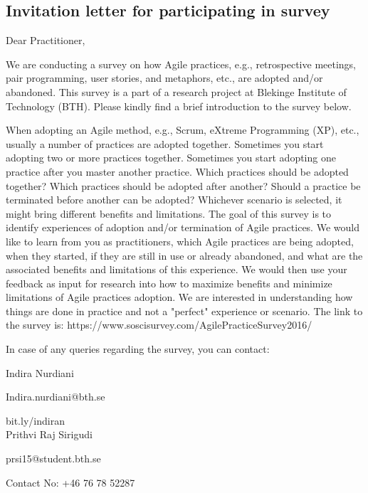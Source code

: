 \documentclass[a4paper,oneside]{bth}
\begin{document}


\cleardoublepage
	\begin{appendices}
			\chapter{Invitation letter for participating in survey}\label{appendix A}
 Dear Practitioner,
            
We are conducting a survey on how Agile practices, e.g., retrospective meetings, pair programming, user stories, and metaphors, etc., are adopted and/or abandoned. This survey is a part of a research project at Blekinge Institute of Technology (BTH). Please kindly find a brief introduction to the survey below.

When adopting an Agile method, e.g., Scrum, eXtreme Programming (XP), etc., usually a number of practices are adopted together. Sometimes you start adopting two or more practices together. Sometimes you start adopting one practice after you master another practice. Which practices should be adopted together? Which practices should be adopted after another? Should a practice be terminated before another can be adopted? Whichever scenario is selected, it might bring different benefits and limitations.
The goal of this survey is to identify experiences of adoption and/or termination of Agile practices. We would like to learn from you as practitioners, which Agile practices are being adopted, when they started, if they are still in use or already abandoned, and what are the associated benefits and limitations of this experience. We would then use your feedback as input for research into how to maximize benefits and minimize limitations of Agile practices adoption. We are interested in understanding how things are done in practice and not a "perfect" experience or scenario.
The link to the survey is: https://www.soscisurvey.com/AgilePracticeSurvey2016/

In case of any queries regarding the survey, you can contact:\begin{flushleft}


Indira Nurdiani

Indira.nurdiani@bth.se

bit.ly/indiran \\

Prithvi Raj Sirigudi

prsi15@student.bth.se

Contact No: +46 76 78 52287\\


\end{flushleft}
\end{appendices}
\end{document}
